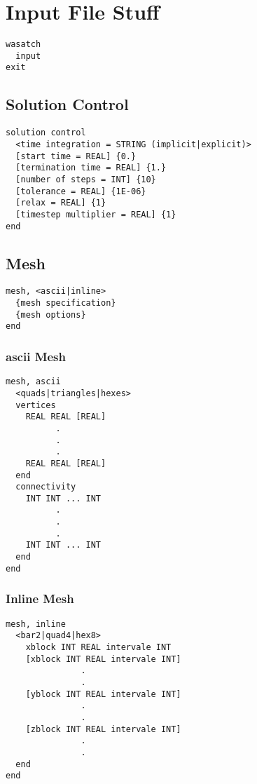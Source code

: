 \documentclass[10pt]{article}
\begin{document}
\section{Input File Stuff}

\begin{verbatim}
wasatch
  input
exit
\end{verbatim}

\subsection{Solution Control}
\begin{verbatim}
solution control
  <time integration = STRING (implicit|explicit)>
  [start time = REAL] {0.}
  [termination time = REAL] {1.}
  [number of steps = INT] {10}
  [tolerance = REAL] {1E-06}
  [relax = REAL] {1}
  [timestep multiplier = REAL] {1}
end
\end{verbatim}

\subsection{Mesh}
\begin{verbatim}
mesh, <ascii|inline>
  {mesh specification}
  {mesh options}
end
\end{verbatim}

\subsubsection{ascii Mesh}
%
\begin{verbatim}
mesh, ascii
  <quads|triangles|hexes>
  vertices
    REAL REAL [REAL]
          .
          .
          .
    REAL REAL [REAL]
  end
  connectivity
    INT INT ... INT
          .
          .
          .
    INT INT ... INT
  end
end
\end{verbatim}

\subsubsection{Inline Mesh}
%
\begin{verbatim}
mesh, inline
  <bar2|quad4|hex8>
    xblock INT REAL intervale INT
    [xblock INT REAL intervale INT]
               .
               .
    [yblock INT REAL intervale INT]
               .
               .
    [zblock INT REAL intervale INT]
               .
               .
  end
end
\end{verbatim}
\end{document}
